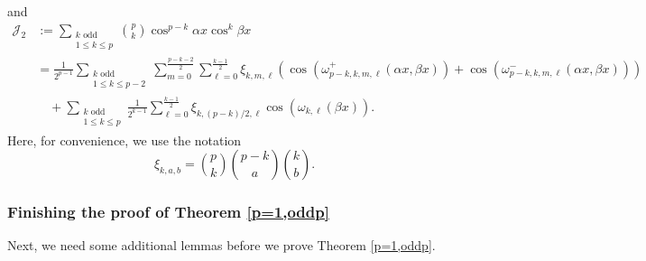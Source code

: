 \documentclass[12pt, reqno]{amsart}
\theoremstyle{plain}
\theoremstyle{definition}
\begin{document}
and
\begin{align*}
    \mathcal{J}_2 &:=\sum_{\substack{k \text{ odd}\\ 1\le k\le p}}\binom{p}{k}\cos^{p-k}\alpha x\cos^k \beta x\\
    &=\frac{1}{2^{p-1}}\sum_{\substack{k \text{ odd}\\ 1\leq k\leq p-2}}\sum_{m=0}^{\frac{p-k-2}{2}}\sum_{\ell=0}^{\frac{k-1}{2}}\xi_{k,m,\ell}(\cos(\omega^+_{p-k,k,m,\ell}(\alpha x, \beta x))+\cos(\omega^-_{p-k,k,m,\ell}(\alpha x, \beta x)))\\
    &\quad+\sum_{\substack{k \text{ odd}\\ 1\leq k\leq p}}\frac{1}{2^{k-1}}\sum_{\ell=0}^{\frac{k-1}{2}}\xi_{k,(p-k)/2,\ell}\cos(\omega_{k,\ell}(\beta x)).
\end{align*}
Here, for convenience, we use the notation
\[\xi_{k,a,b}={p\choose k}{p-k\choose a}{k\choose b}.\]


\subsubsection{Finishing the proof of Theorem \ref{p=1,oddp}}

Next, we need some additional lemmas before we prove Theorem \ref{p=1,oddp}.
\end{document}
